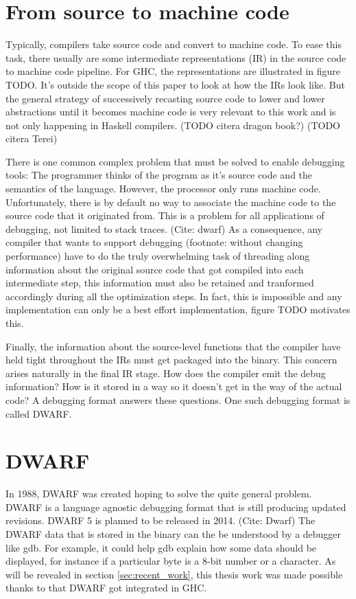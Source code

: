 

\section{From source to machine code}

Typically, compilers take source code and convert to machine code. To ease this
task, there usually are some intermediate representations (IR) in the source
code to machine code pipeline.  For GHC, the representations are illustrated in
figure TODO. It's outside the scope of this paper to look at how the IRs
look like. But the general strategy of successively recasting source code to lower and
lower abstractions until it becomes machine code is very relevant to this work
and is not only happening in Haskell compilers. (TODO citera dragon book?) (TODO citera Terei)

There is one common complex problem that must be solved to enable debugging
tools: The programmer thinks of the program as it's source code and the
semantics of the language. However, the processor only runs machine code.
Unfortunately, there is by default no way to associate the machine code to the
source code that it originated from. This is a problem for all applications of
debugging, not limited to stack traces. (Cite: dwarf) As a consequence, any
compiler that wants to support debugging (footnote: without changing
performance) have to do the truly overwhelming task of threading along
information about the original source code that got compiled into each
intermediate step, this information must also be retained and tranformed
accordingly during all the optimization steps. In fact, this is impossible and
any implementation can only be a best effort implementation, figure TODO
motivates this.

Finally, the information  about the source-level functions that the compiler
have held tight throughout the IRs must get packaged into the binary. This
concern arises naturally in the final IR stage.  How does the compiler emit the
debug information? How is it stored in a way so it doesn't get in the way of the
actual code?  A debugging format answers these questions. One such debugging
format is called DWARF.

\section{DWARF}

In 1988, DWARF was created hoping to solve the quite general problem. DWARF is
a language agnostic debugging format that is still producing updated revisions.
DWARF 5 is planned to be released in 2014. (Cite: Dwarf) The DWARF data that is
stored in the binary can the be understood by a debugger like gdb. For example,
it could help gdb explain how some data should be displayed, for instance if a
particular byte is a 8-bit number or a character. As will be revealed in
section \ref{sec:recent_work}, this thesis work was made possible thanks
to that DWARF got integrated in GHC.
